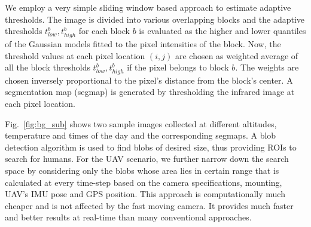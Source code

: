 \documentclass[runningheads]{llncs}
\begin{document}
We employ a very simple sliding window based approach to estimate adaptive thresholds. The image is divided into various overlapping blocks and the adaptive thresholds $t_{low}^b, t_{high}^b$ for each block $b$ is evaluated as the higher and lower quantiles of the Gaussian models fitted to the pixel intensities of the block. Now, the threshold values at each pixel location $(i, j)$ are chosen as weighted average of all the block thresholds $t_{low}^b, t_{high}^b$ if the pixel belongs to block $b$. The weights are chosen inversely proportional to the pixel's distance from the block's center. A segmentation map (segmap) is generated by thresholding the infrared image at each pixel location.

Fig.~\ref{fig:bg_sub} shows two sample images collected at different altitudes, temperature and times of the day and the corresponding segmaps. A blob detection algorithm \cite{cvblob} is used to find blobs of desired size, thus providing ROIs to search for humans. For the UAV scenario, we further narrow down the search space by considering only the blobs whose area lies in certain range that is calculated at every time-step based on the camera specifications, mounting, UAV's IMU pose and GPS position. This approach is computationally much cheaper and is not affected by the fast moving camera. It provides much faster and better results at real-time than many conventional approaches.
\end{document}

